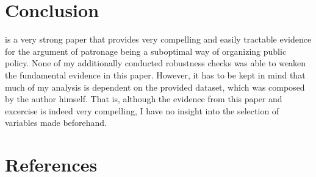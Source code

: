 \documentclass[a4paper]{article}\usepackage[]{graphicx}\usepackage[]{xcolor}
\begin{document}
\section{Conclusion}
\cite{guoxu2018} is a very strong paper that provides very compelling and easily tractable evidence for the argument of patronage being a suboptimal way of organizing public policy. None of my additionally conducted robustness checks was able to weaken the fundamental evidence in this paper. However, it has to be kept in mind that much of my analysis is dependent on the provided dataset, which was composed by the author himself. That is, although the evidence from this paper and excercise is indeed very compelling, I have no insight into the selection of variables made beforehand. 

\section{References}
\printbibliography[heading=none]
\end{document}
